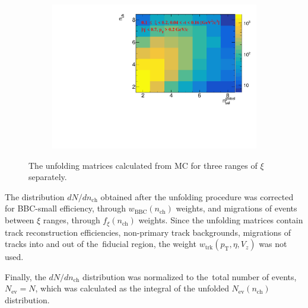 \begin{figure}[h!]
\begin{subfigure}{.49\textwidth}
		\includegraphics[width=\textwidth,page=1]{chapters/chrgSTAR/img/unfolding/matrix_2.pdf}
	\end{subfigure}
	\begin{minipage}{.49\textwidth}
		\caption{The unfolding matrices calculated  from MC for three ranges of $\xi$ separately.}
		\label{fig:responseSTAR}
	\end{minipage}
	\vspace{-0.5cm}
\end{figure}

The distribution $dN/dn_\textrm{ch}$ obtained after the unfolding procedure
was corrected for BBC-small efficiency, through $w_\textrm{BBC}(n_\textrm{ch})$ weights, and migrations of events between $\xi$ ranges, through $f_{\xi}(n_\textrm{ch})$ weights. Since the unfolding matrices contain track reconstruction efficiencies, non-primary track backgrounds, migrations of tracks into and out of the~fiducial region, the weight $w_\textrm{trk}\left(p_\textrm{T},\eta,V_{z}\right)$ was not used.

\hspace{\parindent} Finally, the $dN/dn_\textrm{ch}$ distribution was normalized to the~total number of events, $N_\textrm{ev}=N$, which was calculated as the integral of the unfolded $N_\textrm{ev}(n_\textrm{ch})$ distribution.



